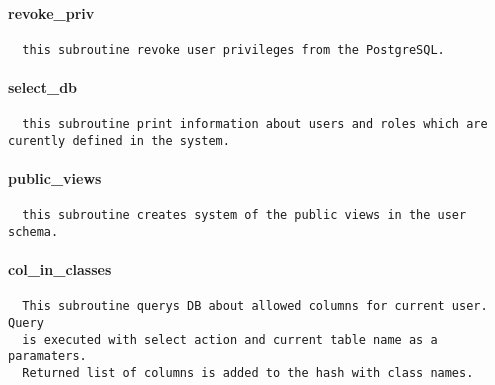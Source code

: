 \paragraph*{revoke\_priv\label{Apiis::Auth::AccessControl_--_used_by_the_runall_pl_and_access_control_pl_scripts_to_define_user_access_rights_revoke_priv}}
\begin{verbatim}
  this subroutine revoke user privileges from the PostgreSQL.
\end{verbatim}
\paragraph*{select\_db\label{Apiis::Auth::AccessControl_--_used_by_the_runall_pl_and_access_control_pl_scripts_to_define_user_access_rights_select_db}}
\begin{verbatim}
  this subroutine print information about users and roles which are curently defined in the system.
\end{verbatim}
\paragraph*{public\_views\label{Apiis::Auth::AccessControl_--_used_by_the_runall_pl_and_access_control_pl_scripts_to_define_user_access_rights_public_views}}
\begin{verbatim}
  this subroutine creates system of the public views in the user schema.
\end{verbatim}
\paragraph*{col\_in\_classes\label{Apiis::Auth::AccessControl_--_used_by_the_runall_pl_and_access_control_pl_scripts_to_define_user_access_rights_col_in_classes}}
\begin{verbatim}
  This subroutine querys DB about allowed columns for current user. Query 
  is executed with select action and current table name as a paramaters. 
  Returned list of columns is added to the hash with class names.
\end{verbatim}
